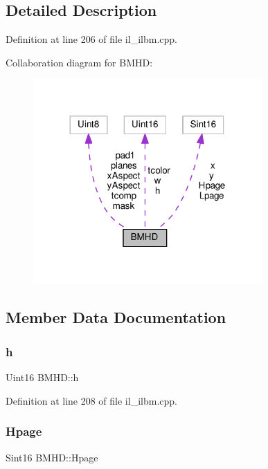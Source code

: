 \subsection{Detailed Description}


Definition at line 206 of file il\+\_\+ilbm.\+cpp.



Collaboration diagram for B\+M\+HD\+:
\nopagebreak
\begin{figure}[H]
\begin{center}
\leavevmode
\includegraphics[width=248pt]{d6/dde/structBMHD__coll__graph}
\end{center}
\end{figure}


\subsection{Member Data Documentation}
\mbox{\label{structBMHD_a813e44dad5aa11c8e4eb54b52a646449}} 
\subsubsection{\texorpdfstring{h}{h}}
{\footnotesize\ttfamily Uint16 B\+M\+H\+D\+::h}



Definition at line 208 of file il\+\_\+ilbm.\+cpp.

\mbox{\label{structBMHD_a3c1c0bd2c647431d9c0f848fbbfd9377}} 
\subsubsection{\texorpdfstring{Hpage}{Hpage}}
{\footnotesize\ttfamily Sint16 B\+M\+H\+D\+::\+Hpage}



